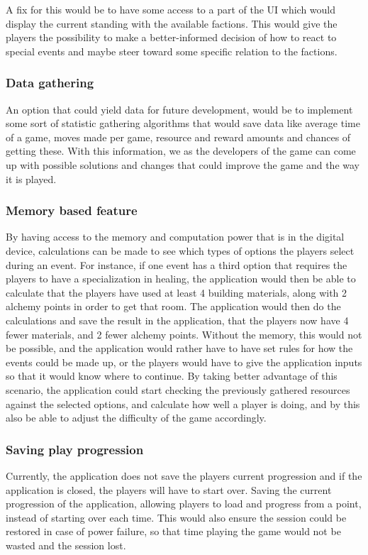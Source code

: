 A fix for this would be to have some access to a part of the UI which would display the current standing with the available factions. This would give the players the possibility to make a better-informed decision of how to react to special events and maybe steer toward some specific relation to the factions.

\subsubsection{Data gathering}
An option that could yield data for future development, would be to implement some sort of statistic gathering algorithms that would save data like average time of a game, moves made per game, resource and reward amounts and chances of getting these. With this information, we as the developers of the game can come up with possible solutions and changes that could improve the game and the way it is played.

\subsubsection{Memory based feature}
By having access to the memory and computation power that is in the digital device, calculations can be made to see which types of options the players select during an event. For instance, if one event has a third option that requires the players to have a specialization in healing, the application would then be able to calculate that the players have used at least 4 building materials, along with 2 alchemy points in order to get that room. The application would then do the calculations and save the result in the application, that the players now have 4 fewer materials, and 2 fewer alchemy points. Without the memory, this would not be possible, and the application would rather have to have set rules for how the events could be made up, or the players would have to give the application inputs so that it would know where to continue. By taking better advantage of this scenario, the application could start checking the previously gathered resources against the selected options, and calculate how well a player is doing, and by this also be able to adjust the difficulty of the game accordingly.

\subsubsection{Saving play progression}
Currently, the application does not save the players current progression and if the application is closed, the players will have to start over. Saving the current progression of the application, allowing players to load and progress from a point, instead of starting over each time. This would also ensure the session could be restored in case of power failure, so that time playing the game would not be wasted and the session lost.

